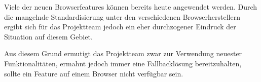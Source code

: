 Viele der neuen Browserfeatures können bereits heute angewendet werden. Durch die mangelnde Standardisierung unter den verschiedenen Browserherstellern ergibt sich für das Projektteam jedoch ein eher durchzogener Eindruck der Situation auf diesem Gebiet.

Aus diesem Grund ermutigt das Projektteam zwar zur Verwendung neuester Funktionalitäten, ermahnt jedoch immer eine Fallbacklösung bereitzuhalten, sollte ein Feature auf einem Browser nicht verfügbar sein.
